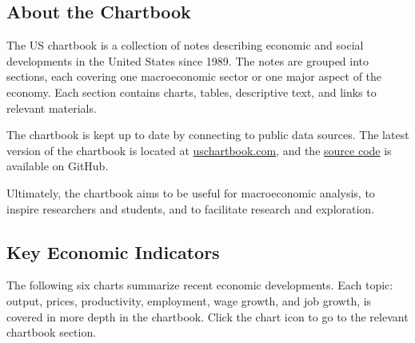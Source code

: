 \documentclass{report}
\begin{document}
\begin{minipage}{0.76\textwidth}
\subsection*{About the Chartbook}

The US chartbook is a collection of notes describing economic and social developments in the United States since 1989. The notes are grouped into sections, each covering one macroeconomic sector or one major aspect of the economy. Each section contains charts, tables, descriptive text, and links to relevant materials. 

The chartbook is kept up to date by connecting to public data sources. The latest version of the chartbook is located at \href{https://www.bd-econ.com/chartbook.html}{uschartbook.com}, and the \href{https://github.com/bdecon/US-chartbook}{source code} is available on GitHub. 

Ultimately, the chartbook aims to be useful for macroeconomic analysis, to inspire researchers and students, and to facilitate research and exploration.
\end{minipage}
\newpage
\thispagestyle{sectpage}
\subsection*{Key Economic Indicators}

\begin{minipage}{0.76\textwidth}
\small The following six charts summarize recent economic developments. Each topic: output, prices, productivity, employment, wage growth, and job growth, is covered in more depth in the chartbook. Click the chart icon \normalsize {\color{blue}\faChartBar[regular]} \small to go to the relevant chartbook section.
\end{minipage}
\vspace{1mm}
\end{document}

